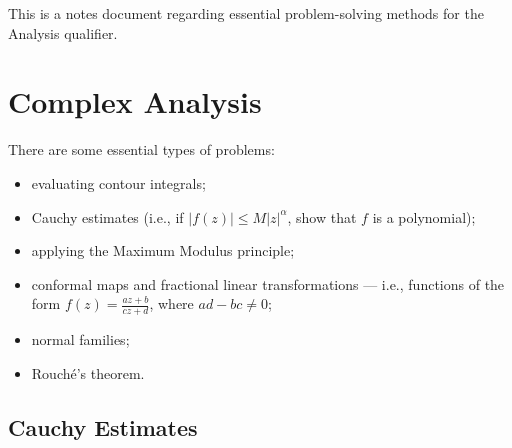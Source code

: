 \documentclass[10pt]{mypackage}
\begin{document}
\RaggedRight
This is a notes document regarding essential problem-solving methods for the Analysis qualifier.
\section{Complex Analysis}%
There are some essential types of problems:
\begin{itemize}
  \item evaluating contour integrals;
  \item Cauchy estimates (i.e., if $\left\vert f(z) \right\vert \leq M\left\vert z \right\vert^{\alpha}$, show that $f$ is a polynomial);
  \item applying the Maximum Modulus principle;
  \item conformal maps and fractional linear transformations --- i.e., functions of the form $f(z) = \frac{az + b}{cz + d}$, where $ad-bc \neq 0$;
  \item normal families;
  \item Rouché's theorem.
\end{itemize}
\subsection{Cauchy Estimates}%
\end{document}
